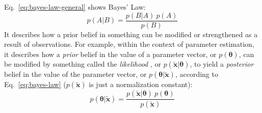 Eq.~\ref{eq:bayes-law-general} shows Bayes' Law:
\begin{equation}\label{eq:bayes-law-general}
p(A|B) = \frac{p(B|A)\:p(A)}{p(B)}
\end{equation}
It describes how a prior belief in something can be modified or strengthened as a result of observations. For example, within the context of parameter estimation, it describes how a \textit{prior} belief in the value of a parameter vector, or $p(\boldsymbol\theta)$, can be modified by something called the \textit{likelihood} , or $p(\tilde{\mathbf{x}}|\boldsymbol\theta)$, to yield a \textit{posterior} belief in the value of the parameter vector, or $p(\boldsymbol\theta|\tilde{\mathbf{x}})$,  according to Eq.~\ref{eq:bayes-law} ($p(\tilde{\mathbf{x}})$ is just a normalization constant):
\begin{equation}\label{eq:bayes-law}
p(\boldsymbol\theta|\tilde{\mathbf{x}}) = \frac{p(\tilde{\mathbf{x}}|\boldsymbol\theta)\:p(\boldsymbol\theta)}{p(\tilde{\mathbf{x}})}
\end{equation}

%
%
%
%
%
%












